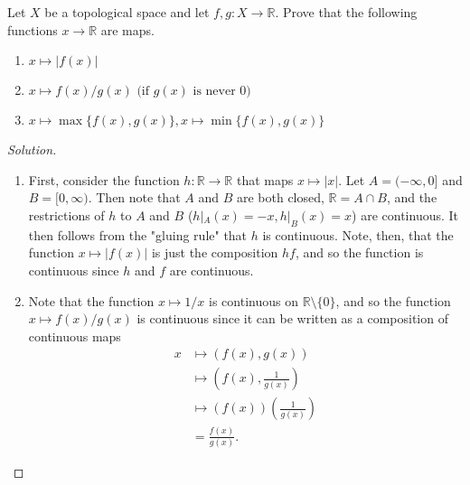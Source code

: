 \documentclass[12pt]{article}
\newenvironment{problem}[2][Problem]{\begin{trivlist}
\item[\hskip \labelsep {\bfseries #1}\hskip \labelsep {\bfseries #2.}]}{\end{trivlist}}
\newcommand{\R}{\mathbb{R}}
\newenvironment{solution}
  {\renewcommand\qedsymbol{$\blacksquare$}\begin{proof}[Solution]}
{\end{proof}}
\theoremstyle{remark}
\begin{document}
\begin{problem}{5.4}
  Let $X$ be a topological space and let $f,g:X\to\R$.
  Prove that the following functions $x\to\R$ are maps.
  \begin{enumerate}[label=(\alph*)]
    \item $x\mapsto |f(x)|$
    \item $x\mapsto f(x)/g(x) \text{ (if $g(x)$ is never 0)}$
    \item $x\mapsto \max\{f(x),g(x)\}, x\mapsto\min\{f(x),g(x)\}$
  \end{enumerate}
\end{problem}
\begin{solution}\ 
  \begin{enumerate}[label=(\alph*)]
    \item First, consider the function $h:\R\to\R$ that maps $x\mapsto |x|$.
      Let $A=(-\infty,0]$ and $B=[0,\infty)$.
      Then note that $A$ and $B$ are both closed, $\R=A\cap B$, and the restrictions
      of $h$ to $A$ and $B$ ($h|_A(x)=-x, h|_B(x)=x$) are continuous.
      It then follows from the "gluing rule" that $h$ is continuous.
      Note, then, that the function $x\mapsto|f(x)|$ is just the composition
      $hf$, and so the function is continuous since $h$ and $f$ are continuous.
    \item Note that the function $x\mapsto 1/x$ is continuous on $\R\setminus\{0\}$, and 
      so the function $x\mapsto f(x)/g(x)$ is continuous since it can be written
      as a composition of continuous maps
      \begin{align*}
        x &\mapsto (f(x),g(x))\\
        &\mapsto \left(f(x),\frac{1}{g(x)}\right)\\
        &\mapsto (f(x))\left( \frac{1}{g(x)} \right)\\
        &= \frac{f(x)}{g(x)}.
      \end{align*}
  \end{enumerate}
\end{solution}
\end{document}
